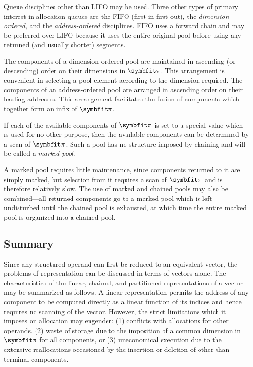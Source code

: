 \par Queue disciplines other than LIFO may be used. Three other types of primary interest in allocation queues are the FIFO (first in first out), the \textit{dimension-ordered}, and the \textit{address-ordered} disciplines. FIFO uses a forward chain and may be preferred over LIFO because it uses the entire original pool before using any returned (and usually shorter) segments.

\par The components of a dimension-ordered pool are maintained in ascending (or descending) order on their dimensions in $\vect{\pi}$. This arrangement is convenient in selecting a pool element according to the dimension required. The components of an address-ordered pool are arranged in ascending order on their leading addresses. This arrangement facilitates the fusion of components which together form an infix of $\vect{\pi}$.

\par If each of the available components of $\vect{\pi}$ is set to a special value which is used for no other purpose, then the available components can be determined by a scan of $\vect{\pi}$. Such a pool has no structure imposed by chaining and will be called a \textit{marked pool}.

\par A marked pool requires little maintenance, since components returned to it are simply marked, but selection from it requires a scan of $\vect{\pi}$ and is therefore relatively slow. The use of marked and chained pools may also be combined---all returned components go to a marked pool which is left undisturbed until the chained pool is exhausted, at which time the entire marked pool is organized into a chained pool.

\subsection*{Summary}

\par Since any structured operand can first be reduced to an equivalent vector, the problems of representation can be discussed in terms of vectors alone. The characteristics of the linear, chained, and partitioned representations of a vector may be summarized as follows. A linear representation permits the address of any component to be computed directly as a linear function of its indices and hence requires no scanning of the vector. However, the strict limitations which it imposes on allocation may engender: (1) conflicts with allocations for other operands, (2) waste of storage due to the imposition of a common dimension in $\vect{\pi}$ for all components, or (3) uneconomical execution due to the extensive reallocations occasioned by the insertion or deletion of other than terminal components.

